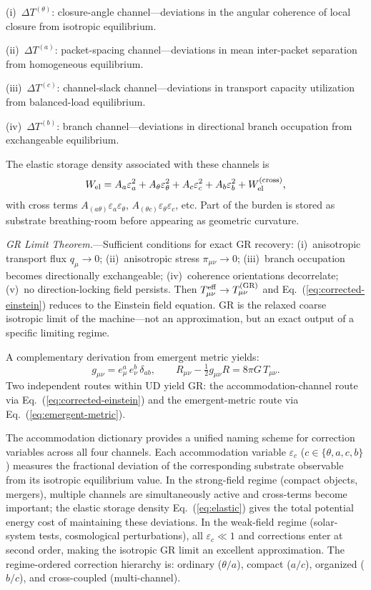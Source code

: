 \documentclass[11pt,twocolumn]{article}
\begin{document}
(i)~$\Delta T^{(\theta)}$: closure-angle channel---deviations in the angular coherence of local closure from isotropic equilibrium.

(ii)~$\Delta T^{(a)}$: packet-spacing channel---deviations in mean inter-packet separation from homogeneous equilibrium.

(iii)~$\Delta T^{(c)}$: channel-slack channel---deviations in transport capacity utilization from balanced-load equilibrium.

(iv)~$\Delta T^{(b)}$: branch channel---deviations in directional branch occupation from exchangeable equilibrium.

The elastic storage density associated with these channels is
\begin{equation}
\label{eq:elastic}
W_{\rm el} = A_a\varepsilon_a^2 + A_\theta\varepsilon_\theta^2 + A_c\varepsilon_c^2 + A_b\varepsilon_b^2 + W_{\rm el}^{(\rm cross)},
\end{equation}
with cross terms $A_{(a\theta)}\varepsilon_a\varepsilon_\theta$, $A_{(\theta c)}\varepsilon_\theta\varepsilon_c$, etc.
Part of the burden is stored as substrate breathing-room before appearing as geometric curvature.

\emph{GR Limit Theorem.}---Sufficient conditions for exact GR recovery: (i)~anisotropic transport flux $q_\mu \to 0$; (ii)~anisotropic stress $\pi_{\mu\nu} \to 0$; (iii)~branch occupation becomes directionally exchangeable; (iv)~coherence orientations decorrelate; (v)~no direction-locking field persists.
Then $T^{\rm eff}_{\mu\nu} \to T^{(\rm GR)}_{\mu\nu}$ and Eq.~(\ref{eq:corrected-einstein}) reduces to the Einstein field equation.
GR is the relaxed coarse isotropic limit of the machine---not an approximation, but an exact output of a specific limiting regime.\cite{bransdicke}

A complementary derivation from emergent metric yields:\cite{dpd}
\begin{equation}
\label{eq:emergent-metric}
g_{\mu\nu} = e^a_\mu\,e^b_\nu\,\delta_{ab}, \qquad R_{\mu\nu} - \tfrac{1}{2}g_{\mu\nu}R = 8\pi G\,T_{\mu\nu}.
\end{equation}
Two independent routes within UD yield GR: the accommodation-channel route via Eq.~(\ref{eq:corrected-einstein}) and the emergent-metric route via Eq.~(\ref{eq:emergent-metric}).

The accommodation dictionary provides a unified naming scheme for correction variables across all four channels.
Each accommodation variable $\varepsilon_c$ ($c \in \{\theta, a, c, b\}$) measures the fractional deviation of the corresponding substrate observable from its isotropic equilibrium value.
In the strong-field regime (compact objects, mergers), multiple channels are simultaneously active and cross-terms become important; the elastic storage density Eq.~(\ref{eq:elastic}) gives the total potential energy cost of maintaining these deviations.
In the weak-field regime (solar-system tests, cosmological perturbations), all $\varepsilon_c \ll 1$ and corrections enter at second order, making the isotropic GR limit an excellent approximation.
The regime-ordered correction hierarchy is: ordinary ($\theta/a$), compact ($a/c$), organized ($b/c$), and cross-coupled (multi-channel).
\end{document}
